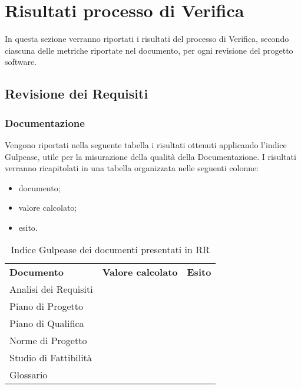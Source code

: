 \appendix
\section{Risultati processo di Verifica}
In questa sezione verranno riportati i risultati del processo di Verifica, secondo ciascuna delle metriche riportate nel documento, per ogni revisione del progetto software.

\subsection{Revisione dei Requisiti}
\subsubsection{Documentazione}
Vengono riportati nella seguente tabella i risultati ottenuti applicando l'indice Gulpease, utile per la misurazione della qualità della Documentazione. I risultati verranno ricapitolati in una tabella organizzata nelle seguenti colonne:
\begin{itemize}
	\item documento;
	\item valore calcolato;
	\item esito.
\end{itemize}

\renewcommand{\arraystretch}{2.2}
\begin{longtable}{|C{5.5cm}|C{2cm}|C{4.5cm}|}
	
	\caption{Indice Gulpease dei documenti presentati in RR}\\
	\hline
	
	\textbf{Documento} & \textbf{Valore calcolato}  & \textbf{Esito} 
	\tabularnewline
	\endhead
	
	Analisi dei Requisiti &  &  \\
	Piano di Progetto &  &  \\
	Piano di Qualifica &  &   \\ 
	Norme di Progetto &  &  \\	
	Studio di Fattibilità &  &  \\
	Glossario &  &   \\
\end{longtable}